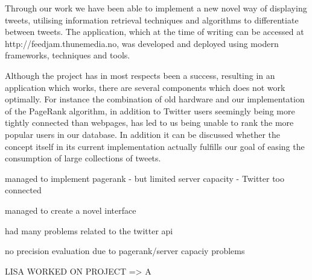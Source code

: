 Through our work we have been able to implement a new novel way of displaying tweets, utilising information retrieval techniques and algorithms to differentiate between tweets. The application, which at the time of writing can be accessed at http://feedjam.thunemedia.no, was developed and deployed using modern frameworks, techniques and tools.

Although the project has in most respects been a success, resulting in an application which works, there are several components which does not work optimally. For instance the combination of old hardware and our implementation of the PageRank algorithm, in addition to Twitter users seemingly being more tightly connected than webpages, has led to us being unable to rank the more popular users in our database. In addition it can be discussed whether the concept itself in its current implementation actually fulfills our goal of easing the consumption of large collections of tweets.


managed to implement pagerank
- but limited server capacity
- Twitter too connected

managed to create a novel interface

had many problems related to the twitter api

no precision evaluation due to pagerank/server capaciy problems

LISA WORKED ON PROJECT => A